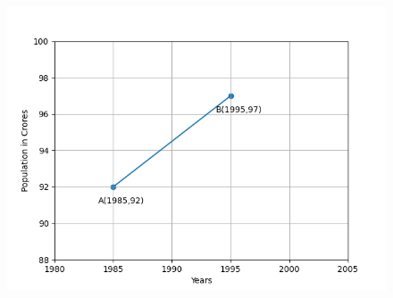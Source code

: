 \begin{enumerate}[label=\thesection.\arabic*,ref=\thesection.\theenumi]
\\
\begin{figure}[ht]
\centering
\includegraphics[width = \columnwidth]{chapters/11/10/1/14/figs/fig.png}
\caption{}
\label{fig:chapters/11/10/1/14/1}
\end{figure}
\solution


\end{enumerate}
